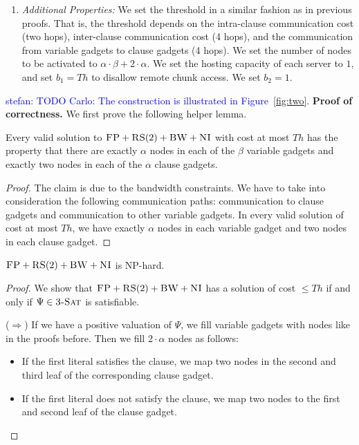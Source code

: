\documentclass[9pt]{sigcomm-alternate}
\newcommand{\stefan}[1]{\textcolor{blue}{stefan: #1}}
\newcommand{\clauses}{\alpha}
\newcommand{\vars}{\beta}
\newcommand{\CC}{\textsc{NI}}
\newcommand{\FP}{\textsc{FP}}
\newcommand{\RS}{\textsc{RS}}
\newcommand{\BW}{\textsc{BW}}
\newcommand{\CostTrans}{\ensuremath{b_1}}
\newcommand{\CostCom}{\ensuremath{b_2}}
\newcommand{\TSAT}{\textsc{3-Sat}}
\newcommand{\Formula}{\ensuremath{\Psi}}
\newcommand{\Thr}{\ensuremath{Th}}
\begin{document}
\begin{appendix}
\begin{enumerate}
  \item \emph{Additional Properties:} We set the threshold in a
    similar fashion as in previous proofs. That is,
the threshold depends on the intra-clause communication cost (two hops),
inter-clause communication cost (4 hops),
  and the communication from variable gadgets to clause gadgets (4 hops). We
  set the number of nodes to be activated to $\clauses \cdot \vars + 2 \cdot
  \clauses$. We set the hosting capacity of each server to $1$, and set
  $\CostTrans = \Thr$ to disallow remote chunk access. We set $\CostCom = 1$.


 \end{enumerate}

\stefan{TODO Carlo: The construction is illustrated in Figure~\ref{fig:two}.}
\textbf{Proof of correctness.}
We first prove the following helper lemma.
\begin{lemma}
Every valid solution to $\FP+\RS(2)+\BW+\CC$
with cost at most $\Thr$ has the property that
there are exactly $\clauses$ nodes in each of the $\vars$ variable gadgets
and exactly two nodes in each of the $\clauses$ clause gadgets.
\end{lemma}
\begin{proof}
The claim is due to the bandwidth constraints. We have to take into
consideration the following communication paths:
communication to clause gadgets and
communication to
other variable gadgets.
In every valid solution of cost at most $\Thr$, we have exactly
$\clauses$ nodes in each variable gadget and two nodes in each clause gadget.
\end{proof}

\begin{theorem}
$\FP+\RS(2)+\BW+\CC$ is NP-hard.
\end{theorem}
\begin{proof}
We show that $\FP+\RS(2)+\BW+\CC$ has a solution of cost $\leq
  \Thr$ if and only if $\Formula\in \TSAT$ is satisfiable.

($\Rightarrow$) If we have a positive valuation of $\Formula$, we fill variable gadgets with nodes like in
the proofs before. Then we fill $2 \cdot \clauses$ nodes as follows:
\begin{itemize}
\item If the first literal satisfies the clause, we map two nodes in the second and
third leaf of the corresponding clause gadget.
\item If the first literal does not satisfy the clause, we map two nodes to the first
and second leaf of the clause gadget.
\end{itemize}


\end{proof}
\end{appendix}
\end{document}
